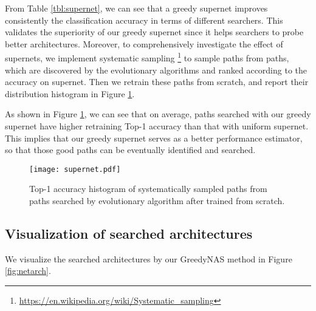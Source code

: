 \documentclass[10pt,twocolumn,letterpaper]{article}
\begin{document}
From Table \ref{tbl:supernet}, we can see that a greedy supernet improves consistently the classification accuracy in terms of different searchers. This validates the superiority of our greedy supernet since it helps searchers to probe better architectures. Moreover, to comprehensively investigate the effect of supernets, we implement systematic sampling \footnote{\url{https://en.wikipedia.org/wiki/Systematic_sampling}} to sample  paths from  paths, which are discovered by the evolutionary algorithms and ranked according to the accuracy on supernet. Then we retrain these  paths from scratch, and report their distribution histogram in Figure \ref{fig:supernet}. 

As shown in Figure \ref{fig:supernet}, we can see that on average, paths searched with our greedy supernet have higher retraining Top-1 accuracy than that with uniform supernet. This implies that our greedy supernet serves as a better performance estimator, so that those good paths can be eventually identified and searched. 

\begin{figure}[t]
	\centering
	\texttt{[image: supernet.pdf]}
\caption{Top-1 accuracy histogram of  systematically sampled paths from  paths searched by evolutionary algorithm after trained from scratch. }
\label{fig:supernet}
\end{figure}

\newpage
\subsection{Visualization of searched architectures}
We visualize the searched architectures by our GreedyNAS method in Figure \ref{fig:netarch}.  

\begin{figure*}[t]
	\centering
	\hspace{5mm}
	\hspace{5mm}
\caption{Visualization of searched architectures by GreedyNAS in Table 2.}
	\label{fig:netarch}
\end{figure*}
\end{document}
